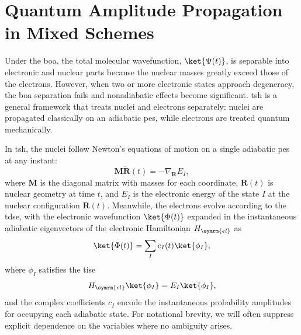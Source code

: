 \section{Quantum Amplitude Propagation in Mixed Schemes}\label{sec:quantum_amplitude_propagation_in_mixed_themes}
Under the \acrfull{boa}, the total molecular wavefunction, $\ket{\Psi(t)}$, is separable into electronic and nuclear parts because the nuclear masses greatly exceed those of the electrons. However, when two or more electronic states approach degeneracy, the \acrshort{boa} separation fails and nonadiabatic effects become significant. \acrfull{tsh} is a general framework that treats nuclei and electrons separately: nuclei are propagated classically on an adiabatic \acrfull{pes}, while electrons are treated quantum mechanically.

In \acrshort{tsh}, the nuclei follow Newton's equations of motion on a single adiabatic \acrshort{pes} at any instant:
\begin{equation}
\symbf{M}\ddot{\symbf{R}}(t)=-\nabla_{\symbf{R}}E_I,
\end{equation}
where $\symbf{M}$ is the diagonal matrix with masses for each coordinate, $\symbf{R}(t)$ is nuclear geometry at time $t$, and $E_I$ is the electronic energy of the state $I$ at the nuclear configuration $\symbf{R}(t)$. Meanwhile, the electrons evolve according to the \acrshort{tdse}, with the electronic wavefunction $\ket{\Phi(t)}$ expanded in the instantaneous adiabatic eigenvectors of the electronic Hamiltonian $H_{\symrm{el}}$ as
\begin{equation}
\ket{\Phi(t)}=\sum_I c_I(t)\ket{\phi_I},
\end{equation}
where $\phi_I$ satisfies the \acrfull{tise}
\begin{equation}
H_{\symrm{el}}\ket{\phi_I}=E_I\ket{\phi_I},
\end{equation}
and the complex coefficients $c_I$ encode the instantaneous probability amplitudes for occupying each adiabatic state. For notational brevity, we will often suppress explicit dependence on the variables where no ambiguity arises.

